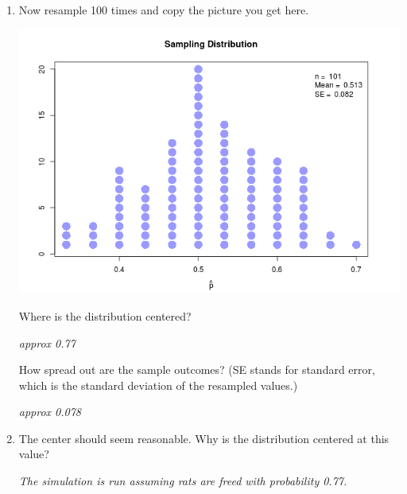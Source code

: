 \begin{enumerate}
\begin{key}
{\it  AWV}
\end{key}

 \item Now resample 100 times and copy the picture you get here.
\begin{students}
  \vspace{4cm}
\end{students}

\begin{key}
  \includegraphics[width=.5\linewidth]{plots/freeRats-101resamples.png}
\end{key} 

   Where is the distribution centered?
\begin{students}
  \vspace{.6cm}
\end{students}

\begin{key}
{\it  approx 0.77}
\end{key}

   How spread out are the sample outcomes? (SE stands for  standard
    error, which is the standard deviation of the resampled values.)
\begin{students}
  \vspace{.6cm}
\end{students}

\begin{key}
{\it  approx 0.078}
\end{key}

 \item The center should seem reasonable.  Why is the distribution
   centered at this value?
\begin{students}
  \vspace{1cm}
\end{students}

\begin{key}
{\it  The simulation is run assuming rats are freed with probability 0.77.}
\end{key}



\end{enumerate}
